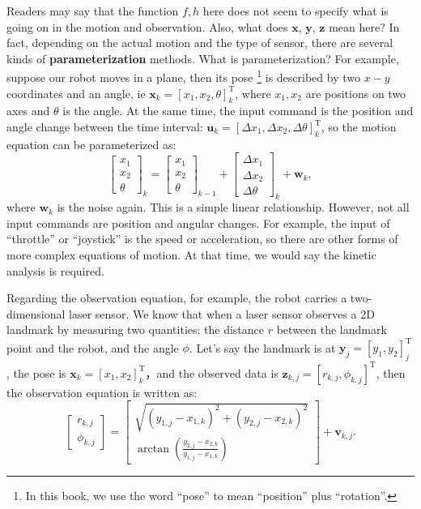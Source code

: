 Readers may say that the function $f,h$ here does not seem to specify what is going on in the motion and observation. Also, what does $\mathbf{x}$, $\mathbf{y}$, $\mathbf{z}$ mean here? In fact, depending on the actual motion and the type of sensor, there are several kinds of \textbf{parameterization} methods. What is parameterization? For example, suppose our robot moves in a plane, then its pose \footnote{ In this book, we use the word ``pose'' to mean ``position'' plus ``rotation''. } is described by two $x-y$ coordinates and an angle, ie $\mathbf{x}_k = [x_1,x_2,\theta]_k^\mathrm{T}$, where $x_1, x_2$ are positions on two axes and $\theta$ is the angle. At the same time, the input command is the position and angle change between the time interval: $\mathbf{u}_k = [ \Delta x_1, \Delta x_2, \Delta \theta ]_k^\mathrm{T} $, so the motion equation can be parameterized as:
\begin{equation}
{\left[ \begin{array}{l}
    x_1\\
    x_2\\
    \theta
    \end{array} \right]_k} = {\left[ \begin{array}{l}
    x_1\\
    x_2\\
    \theta
    \end{array} \right]_{k - 1}} + {\left[ \begin{array}{l}
    \Delta x_1\\
    \Delta x_2\\
    \Delta \theta
    \end{array} \right]_k} + {\mathbf{w}_k},
\end{equation}
where $\mathbf{w}_k$ is the noise again. This is a simple linear relationship. However, not all input commands are position and angular changes. For example, the input of ``throttle'' or ``joystick'' is the speed or acceleration, so there are other forms of more complex equations of motion. At that time, we would say the kinetic analysis is required.

Regarding the observation equation, for example, the robot carries a two-dimensional laser sensor. We know that when a laser sensor observes a 2D landmark by measuring two quantities: the distance $r$ between the landmark point and the robot, and the angle $\phi$. Let's say the landmark is at $\mathbf{y}_j = [y_1, y_2]_j^\mathrm{T}$, the pose is $\mathbf{x}_k=[x_1,x_2]_k^\mathrm{T}$，and the observed data is $\mathbf{z}_{k,j} = [r_{k,j}, \phi_{k,j}]^\mathrm{T}$, then the observation equation is written as:
\begin{equation}
\left[ \begin{array}{l}
r_{k,j}\\
\phi_{k,j}
\end{array} \right] = \left[ \begin{array}{l}
\sqrt {{{\left(y_{1,j} - x_{1,k} \right)}^2} + {{\left( {{y_{2,j}} - x_{2,k} } \right)}^2}} \\
\arctan \left( \frac{{y_{2,j}} - x_{2,k}}{{y_{1,j} - x_{1,k}}} \right)
\end{array} \right] + \mathbf{v}_{k, j}.
\end{equation}

